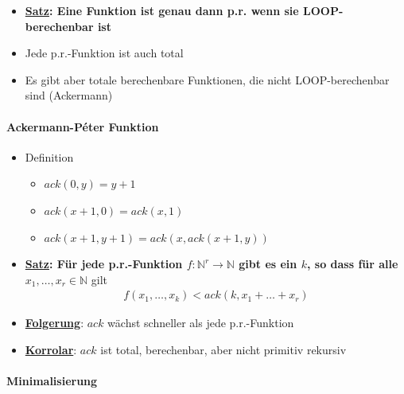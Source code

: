 \documentclass{scrartcl}
\begin{document}
\begin{itemize}
	\item \textbf{\underline{Satz}: Eine Funktion ist genau dann p.r. wenn sie LOOP-berechenbar ist}
	\item Jede p.r.-Funktion ist auch total
	\item Es gibt aber totale berechenbare Funktionen, die nicht LOOP-berechenbar sind (Ackermann)
\end{itemize}

\paragraph{Ackermann-Péter Funktion}

\begin{itemize}
	\item Definition
	\begin{itemize}
		\item $ack(0,y) = y+1$
		\item $ack(x+1,0) = ack(x,1)$
		\item $ack(x+1,y+1) = ack(x,ack(x+1,y))$
	\end{itemize}
	\item \textbf{\underline{Satz}: Für jede p.r.-Funktion $f: \mathbb{N}^r \rightarrow \mathbb{N}$ gibt es ein $k$, so dass für alle $x_1,\ldots,x_r \in \mathbb{N}$} gilt
	\begin{align*}
		f(x_1,\ldots,x_k) < ack(k,x_1+\ldots+x_r)
	\end{align*}
	\item \textbf{\underline{Folgerung}}: $ack$ wächst schneller als jede p.r.-Funktion
	\item \textbf{\underline{Korrolar}}: $ack$ ist total, berechenbar, aber nicht primitiv rekursiv
\end{itemize}

\paragraph{Minimalisierung}
\end{document}
